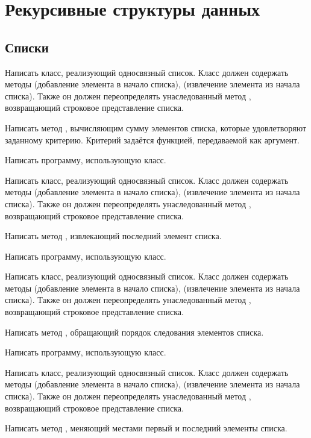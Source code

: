 \section{Рекурсивные структуры данных}

\subsection{Списки}

\task Написать класс, реализующий односвязный список. Класс должен
содержать методы  (добавление элемента в начало списка),
 (извлечение элемента из начала списка). Также он должен
переопределять унаследованный метод , возвращающий
строковое представление списка.

Написать метод , вычисляющим сумму элементов списка, которые
удовлетворяют заданному критерию. Критерий задаётся функцией,
передаваемой как аргумент.

Написать программу, использующую класс.

\task Написать класс, реализующий односвязный список. Класс должен
содержать методы  (добавление элемента в начало списка),
 (извлечение элемента из начала списка). Также он должен
переопределять унаследованный метод , возвращающий
строковое представление списка.

Написать метод , извлекающий последний элемент списка.

Написать программу, использующую класс.

\task Написать класс, реализующий односвязный список. Класс должен
содержать методы  (добавление элемента в начало списка),
 (извлечение элемента из начала списка). Также он должен
переопределять унаследованный метод , возвращающий
строковое представление списка.

Написать метод , обращающий порядок следования элементов
списка.

Написать программу, использующую класс.

\task Написать класс, реализующий односвязный список. Класс должен
содержать методы  (добавление элемента в начало списка),
 (извлечение элемента из начала списка). Также он должен
переопределять унаследованный метод , возвращающий
строковое представление списка.

Написать метод , меняющий местами первый и последний
элементы списка.


